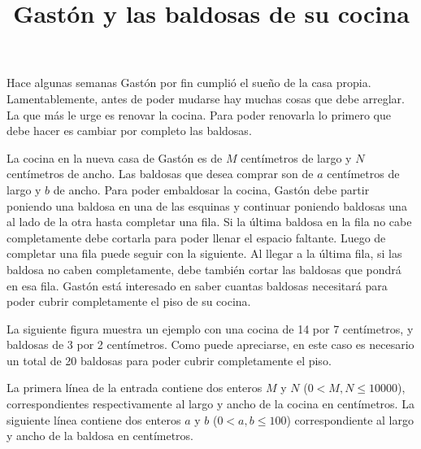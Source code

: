 \documentclass{oci}
\title{Gastón y las baldosas de su cocina}
\begin{document}
\begin{problemDescription}
  Hace algunas semanas Gastón por fin cumplió el sueño de la casa propia.
  Lamentablemente, antes de poder mudarse hay muchas cosas que debe arreglar.
  La que más le urge es renovar la cocina.
  Para poder renovarla lo primero que debe hacer es cambiar por completo las
  baldosas.

  La cocina en la nueva casa de Gastón es de $M$ centímetros de largo y $N$
  centímetros de ancho.
  Las baldosas que desea comprar son de $a$ centímetros de largo y $b$ de ancho.
  Para poder embaldosar la cocina, Gastón debe partir poniendo una baldosa en una
  de las esquinas y continuar poniendo baldosas una al lado de la otra hasta
  completar una fila.
  Si la última baldosa en la fila no cabe completamente debe cortarla para
  poder llenar el espacio faltante.
  Luego de completar una fila puede seguir con la siguiente.
  Al llegar a la última fila, si las baldosa no caben completamente, debe
  también cortar las baldosas que pondrá en esa fila.
  Gastón está interesado en saber cuantas baldosas necesitará para poder cubrir
  completamente el piso de su cocina.

  La siguiente figura muestra un ejemplo con una cocina de 14 por 7 centímetros,
  y baldosas de 3 por 2 centímetros.
  Como puede apreciarse, en este caso es necesario un total de 20 baldosas para
  poder cubrir completamente el piso.
  \begin{center}
  \end{center}
\end{problemDescription}

\begin{inputDescription}
  La primera línea de la entrada contiene dos enteros $M$ y $N$ ($0 < M, N \leq
  10000$), correspondientes respectivamente al largo y ancho de la cocina en
  centímetros.
  La siguiente línea contiene dos enteros $a$ y $b$ ($0 < a, b \leq 100$)
  correspondiente al largo y ancho de la baldosa en centímetros.
\end{inputDescription}
\end{document}
